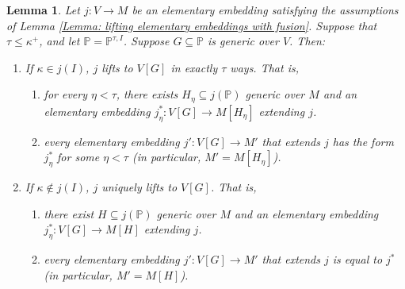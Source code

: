 \documentclass[11pt]{amsart}
\newtheorem{lemma}[theorem]{Lemma}
\theoremstyle{definition}
\theoremstyle{remark}
\newcommand\<{{<}}
\newcommand{\po}{\mathbb{P}}
\begin{document}
\begin{lemma}\label{Lemma: How embeddings lift after the splitting forcing}
    Let $j\colon V\to M$ be an elementary embedding satisfying the assumptions of Lemma \ref{Lemma: lifting elementary embeddings with fusion}. Suppose that $\tau\leq \kappa^{+}$, and let $\po = \po^{\tau,I}$. Suppose $G\subseteq \po$ is generic over $V$. Then:
    \begin{enumerate}
    
        \item If $\kappa\in j(I)$,  $j$ lifts to $V[G]$ in exactly $\tau$ ways. That is, 
            \begin{enumerate}
            \item \label{Clause: eta lifts}for every $\eta<\tau$, there exists $H_\eta\subseteq j(\po)$ generic over $M$ and an elementary embedding $j^*_\eta \colon V[G]\to M[H_\eta]$ extending $j$.
            \item \label{Clause: every lift is one of eta many}every elementary embedding $j'\colon V[G]\to M'$ that extends $j$ has the form $j^*_\eta$ for some $\eta<\tau$ (in particular, $M' = M[H_\eta]$). 
            \end{enumerate}        

        \item If $\kappa\notin j(I)$,  $j$  uniquely lifts to $V[G]$. That is, 
            \begin{enumerate}
            \item \label{Clause: unique lift - existence}there exist $H\subseteq j(\po)$ generic over $M$ and an elementary embedding $j^*_\eta \colon V[G]\to M[H]$ extending $j$.
            \item \label{Clause: unique lift - uniqueness} every elementary embedding $j'\colon V[G]\to M'$ that extends $j$ is equal to $j^*$ (in particular, $M'= M[H]$).
            \end{enumerate}        
    
    \end{enumerate}
\end{lemma}
\end{document}
